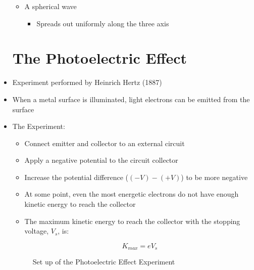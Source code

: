 \begin{itemize}
\begin{itemize}
\begin{itemize}
        \end{itemize}

      \item A spherical wave

        \begin{itemize}

          \item Spreads out uniformly along the three axis

        \end{itemize}

    \end{itemize}

    \section{The Photoelectric Effect}

  \item Experiment performed by Heinrich Hertz (1887)

  \item When a metal surface is illuminated, light electrons can be emitted from the surface

  \item The Experiment:

    \begin{itemize}

      \item Connect emitter and collector to an external circuit

      \item Apply a negative potential to the circuit collector

      \item Increase the potential difference ($(-V)-(+V)$) to be more negative

      \item At some point, even the most energetic electrons do not have enough kinetic energy to reach the collector

      \item The maximum kinetic energy to reach the collector with the stopping voltage, $V_s$, is:

        $$K_{max}=eV_s$$

    \end{itemize}

    \begin{figure}[h!]
      \centering
      
      \caption{Set up of the Photoelectric Effect Experiment}
      \label{fig:1}
    \end{figure}


\end{itemize}
